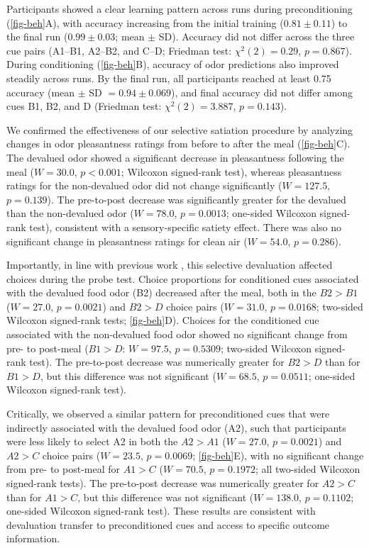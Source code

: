 \documentclass[12pt,letterpaper]{article}
\begin{document}
Participants showed a clear learning pattern across runs during preconditioning (\autoref{fig-beh}A), with accuracy increasing from the initial training ($0.81 \pm 0.11$) to the final run ($0.99 \pm 0.03$; mean $\pm$ SD). Accuracy did not differ across the three cue pairs (A1--B1, A2--B2, and C--D; Friedman test: $\chi^2(2) = 0.29$, $p = 0.867$). During conditioning (\autoref{fig-beh}B), accuracy of odor predictions also improved steadily across runs. By the final run, all participants reached at least 0.75 accuracy (mean $\pm$ SD $= 0.94 \pm 0.069$), and final accuracy did not differ among cues B1, B2, and D (Friedman test: $\chi^2(2) = 3.887$, $p = 0.143$).


We confirmed the effectiveness of our selective satiation procedure by analyzing changes in odor pleasantness ratings from before to after the meal (\autoref{fig-beh}C). The devalued odor showed a significant decrease in pleasantness following the meal ($W = 30.0$, $p < 0.001$; Wilcoxon signed-rank test), whereas pleasantness ratings for the non-devalued odor did not change significantly ($W = 127.5$, $p = 0.139$). The pre-to-post decrease was significantly greater for the devalued than the non-devalued odor ($W = 78.0$, $p = 0.0013$; one-sided Wilcoxon signed-rank test), consistent with a sensory-specific satiety effect. There was also no significant change in pleasantness ratings for clean air ($W = 54.0$, $p = 0.286$).


Importantly, in line with previous work \citep{HowRey2020,liu2025distinct}, this selective devaluation affected choices during the probe test. Choice proportions for conditioned cues associated with the devalued food odor (B2) decreased after the meal, both in the $B2>B1$ ($W = 27.0$, $p = 0.0021$) and $B2>D$ choice pairs ($W = 31.0$, $p = 0.0168$; two-sided Wilcoxon signed-rank tests; \autoref{fig-beh}D). Choices for the conditioned cue associated with the non-devalued food odor showed no significant change from pre- to post-meal ($B1>D$: $W = 97.5$, $p = 0.5309$; two-sided Wilcoxon signed-rank test). The pre-to-post decrease was numerically greater for $B2>D$ than for $B1>D$, but this difference was not significant ($W = 68.5$, $p = 0.0511$; one-sided Wilcoxon signed-rank test).

Critically, we observed a similar pattern for preconditioned cues that were indirectly associated with the devalued food odor (A2), such that participants were less likely to select A2 in both the $A2>A1$ ($W = 27.0$, $p = 0.0021$) and $A2>C$ choice pairs ($W = 23.5$, $p = 0.0069$; \autoref{fig-beh}E), with no significant change from pre- to post-meal for $A1>C$ ($W = 70.5$, $p = 0.1972$; all two-sided Wilcoxon signed-rank tests). The pre-to-post decrease was numerically greater for $A2>C$ than for $A1>C$, but this difference was not significant ($W = 138.0$, $p = 0.1102$; one-sided Wilcoxon signed-rank test). These results are consistent with devaluation transfer to preconditioned cues and access to specific outcome information.
\end{document}

